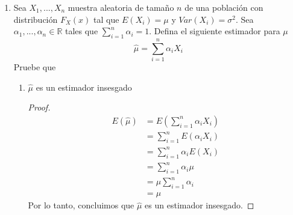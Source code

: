 \documentclass[10pt,a4paper]{article}
\theoremstyle{plain}
\theoremstyle{definition}
\theoremstyle{remark}
\newenvironment{prueba}{\renewcommand{\proofname}{Prueba}\renewcommand{\qedsymbol}{}\begin{proof}}{\end{proof}}
\begin{document}
\begin{enumerate}
    \item Sea $X_1,...,X_n$ muestra aleatoria de tamaño $n$ de una población con distribución $F_X (x)$ tal que $E(X_i) = \mu$ y $Var(X_i) = \sigma^2$. Sea $\alpha_1 ,..., \alpha_n\in\mathbb{R}$ tales que $\sum_{i=1}^{n}\alpha_i = 1$. Defina el siguiente estimador para $\mu$
    \begin{equation*}
        \hat{\mu} = \sum_{i=1}^{n}\alpha_i X_i
    \end{equation*}
    Pruebe que
    \begin{enumerate}
        \item $\hat{\mu}$ es un estimador insesgado
        \begin{prueba}
        \begin{equation*}
            \begin{split}
                E(\hat{\mu}) & = E\left( \sum_{i=1}^{n}\alpha_{i} X_i \right)\\
                & = \sum_{i=1}^{n}E(\alpha_i X_i)\\
                & = \sum_{i=1}^{n}\alpha_i E(X_i) \\
                & = \sum_{i=1}^{n}\alpha_i \mu\\
                & = \mu \sum_{i=1}^{n}\alpha_i\\
                & = \mu
            \end{split}
        \end{equation*}
        Por lo tanto, concluimos que $\hat{\mu}$ es un estimador insesgado.
        \end{prueba}
        

\end{enumerate}
\end{enumerate}
\end{document}
